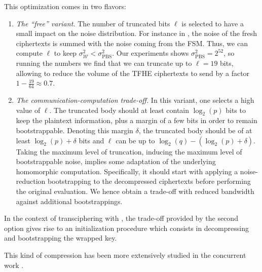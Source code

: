 \noindent This optimization comes in two flavors:
\begin{enumerate}
	\item \emph{The ``free'' variant.} The number of truncated bits $\ell$ is selected to have a small impact on the noise distribution. For instance in \coolName, the noise of the fresh ciphertexts is summed with the noise coming from the FSM. Thus, we can compute $\ell$ to keep $\sigma^2_{\mathcal W} < \sigma^2_{\text{PBS}}$. Our experiments shows $\sigma^2_{\text{PBS}} = 2^{52}$, so running the numbers we find that we can truncate up to $\ell=19$ bits, allowing to reduce the volume of the TFHE ciphertexts to send by a factor $1 - \frac{19}{64} \approx 0.7$.
	
	\smallskip
	
	\item \emph{The communication-computation trade-off.} In this variant, one selects a high value of $\ell$. The truncated body should at least contain $\log_2(p)$ bits to keep the plaintext information, plus a margin of a few bits in order to remain bootstrappable. Denoting this margin $\delta$, the truncated body should be of at least $\log_2(p) + \delta$ bits and $\ell$ can be up to $\log_2(q) - (\log_2(p)+\delta)$. Taking the maximum level of truncation, inducing the maximum level of bootstrappable noise, implies some adaptation of the underlying homomorphic computation. Specifically, it should start with applying a noise-reduction bootstrapping to the decompressed ciphertexts before performing the original evaluation. We hence obtain a trade-off with reduced bandwidth against additional bootstrappings.
\end{enumerate}

In the context of transciphering with \coolName, the trade-off provided by the second option gives rise to an initialization procedure which consists in decompressing and bootstrapping the wrapped key. 

This kind of compression has been more extensively studied in the concurrent work \cite{EPRINT:BCCS24}.

